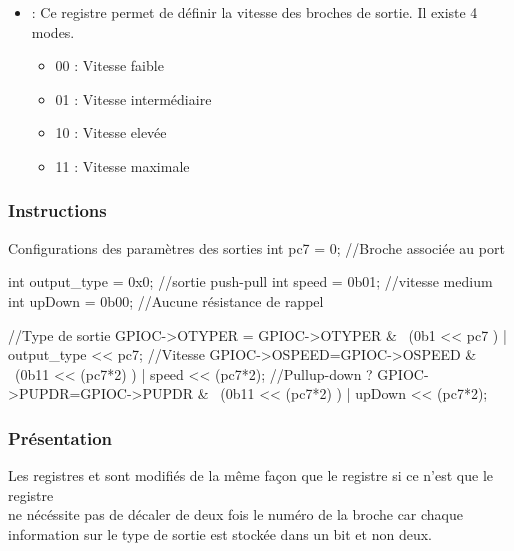{\begin{itemize}
  \begin{itemize}
    \item 0 : sortie push pull
    \item 1 : sortie à drain ouvert
  \end{itemize}

\item {} : Ce registre permet de définir la vitesse des broches de sortie. Il existe 4 modes.

  \begin{itemize}
    \item 00 : Vitesse faible
    \item 01 : Vitesse intermédiaire
    \item 10 : Vitesse elevée
    \item 11 : Vitesse maximale
  \end{itemize}



\end{itemize}


\subsubsection{Instructions}

  \begin{Cpp}{Configurations des paramètres des sorties}
  int pc7 = 0;   //Broche associée au port
  
  int output_type = 0x0;   //sortie push-pull
  int speed = 0b01;        //vitesse medium
  int upDown = 0b00;       //Aucune résistance de rappel

  //Type de sortie
  GPIOC->OTYPER = GPIOC->OTYPER & ~(0b1 << pc7 ) | output_type << pc7; 
  //Vitesse
  GPIOC->OSPEED=GPIOC->OSPEED & ~(0b11 << (pc7*2) ) | speed << (pc7*2);
  //Pullup-down ?
  GPIOC->PUPDR=GPIOC->PUPDR & ~(0b11 << (pc7*2) ) | upDown << (pc7*2);

\end{Cpp}

\subsubsection{Présentation}

Les registres  et  sont modifiés de la même façon que le registre   si ce n'est que le registre \\
 ne nécéssite pas de décaler de deux fois le numéro de la broche car chaque information sur le type de sortie est stockée dans un bit et non deux.


}
